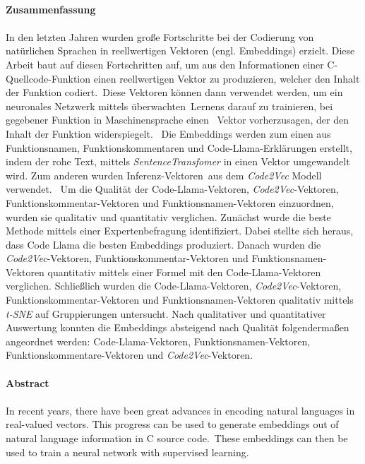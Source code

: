 \documentclass[12pt,letterpaper,ngerman]{article}
\begin{document}
\vspace{1,5cm}
\newpage \hfill\\
{\bf \Large Zusammenfassung}\\\\
In den letzten Jahren wurden große Fortschritte bei der Codierung von 
natürlichen Sprachen in reellwertigen Vektoren (engl. Embeddings) erzielt.
Diese Arbeit baut auf diesen Fortschritten auf, um aus den 
Informationen einer C-Quellcode-Funktion einen reellwertigen 
Vektor zu produzieren,
welcher den Inhalt der Funktion codiert. Diese Vektoren können dann 
verwendet werden, um ein neuronales Netzwerk mittels überwachten Lernens 
darauf zu trainieren, bei gegebener Funktion in Maschinensprache einen 
Vektor vorherzusagen, der den Inhalt der Funktion widerspiegelt. 
Die Embeddings werden zum einen aus Funktionsnamen, Funktionskommentaren 
und Code-Llama-Erklärungen \cite{rozière2024codellamaopenfoundation} 
erstellt, indem der rohe Text, mittels \textit{SentenceTransfomer} 
\cite{reimers-2019-sentence-bert} in einen Vektor umgewandelt wird.
Zum anderen wurden Inferenz-Vektoren aus dem 
\textit{Code2Vec} \cite{code2vec} Modell verwendet.  
Um die Qualität der Code-Llama-Vektoren, \textit{Code2Vec}-Vektoren, 
Funktionskommentar-Vektoren und Funktionsnamen-Vektoren einzuordnen,
wurden sie qualitativ und quantitativ verglichen. Zunächst wurde die 
beste Methode mittels einer Expertenbefragung identifiziert.  
Dabei stellte sich heraus, dass Code Llama die besten Embeddings 
produziert. Danach wurden die \textit{Code2Vec}-Vektoren, 
Funktionskommentar-Vektoren und Funktionsnamen-Vektoren quantitativ 
mittels einer Formel mit den Code-Llama-Vektoren verglichen. 
Schließlich wurden die Code-Llama-Vektoren, \textit{Code2Vec}-Vektoren,
Funktionskommentar-Vektoren und Funktionsnamen-Vektoren qualitativ
mittels \textit{t-SNE} auf Gruppierungen untersucht. Nach
qualitativer 
und quantitativer Auswertung konnten die Embeddings 
absteigend nach Qualität folgendermaßen angeordnet werden:
Code-Llama-Vektoren, Funktionsnamen-Vektoren, 
Funktionskommentare-Vektoren und \textit{Code2Vec}-Vektoren.
\\\\
{\bf \Large Abstract}\\\\
In recent years, there have been great advances in encoding 
natural languages in real-valued vectors. This  progress can
be used to generate embeddings out of natural language 
information in C source code. These embeddings can then be 
used to train a neural network with supervised learning.
\end{document}
